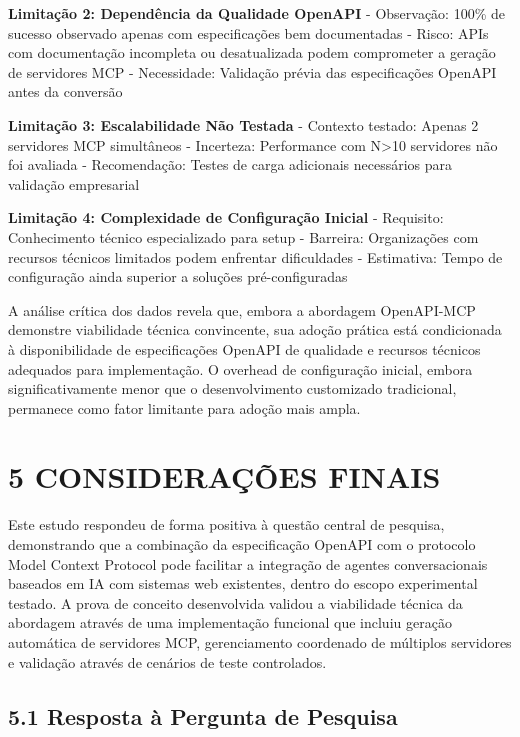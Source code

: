 \documentclass[
]{article}
\begin{document}
\textbf{Limitação 2: Dependência da Qualidade OpenAPI} - Observação:
100\% de sucesso observado apenas com especificações bem documentadas -
Risco: APIs com documentação incompleta ou desatualizada podem
comprometer a geração de servidores MCP - Necessidade: Validação prévia
das especificações OpenAPI antes da conversão

\textbf{Limitação 3: Escalabilidade Não Testada} - Contexto testado:
Apenas 2 servidores MCP simultâneos - Incerteza: Performance com
N\textgreater10 servidores não foi avaliada - Recomendação: Testes de
carga adicionais necessários para validação empresarial

\textbf{Limitação 4: Complexidade de Configuração Inicial} - Requisito:
Conhecimento técnico especializado para setup - Barreira: Organizações
com recursos técnicos limitados podem enfrentar dificuldades -
Estimativa: Tempo de configuração ainda superior a soluções
pré-configuradas

A análise crítica dos dados revela que, embora a abordagem OpenAPI-MCP
demonstre viabilidade técnica convincente, sua adoção prática está
condicionada à disponibilidade de especificações OpenAPI de qualidade e
recursos técnicos adequados para implementação. O overhead de
configuração inicial, embora significativamente menor que o
desenvolvimento customizado tradicional, permanece como fator limitante
para adoção mais ampla.

\section{5 CONSIDERAÇÕES FINAIS}\label{considerauxe7uxf5es-finais}

Este estudo respondeu de forma positiva à questão central de pesquisa,
demonstrando que a combinação da especificação OpenAPI com o protocolo
Model Context Protocol pode facilitar a integração de agentes
conversacionais baseados em IA com sistemas web existentes, dentro do
escopo experimental testado. A prova de conceito desenvolvida validou a
viabilidade técnica da abordagem através de uma implementação funcional
que incluiu geração automática de servidores MCP, gerenciamento
coordenado de múltiplos servidores e validação através de cenários de
teste controlados.

\subsection{5.1 Resposta à Pergunta de
Pesquisa}\label{resposta-uxe0-pergunta-de-pesquisa}
\end{document}
